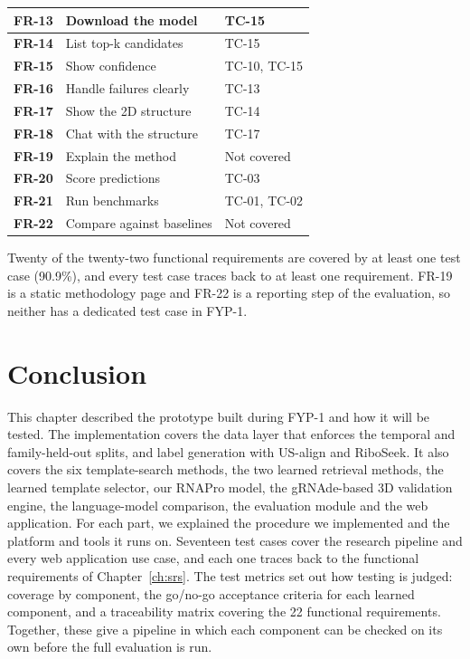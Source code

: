 \documentclass{FastFyp}
\begin{document}
{\begin{longtable}{|p{3.6cm}|p{5.6cm}|p{4.8cm}|}
\textbf{FR-13} & Download the model & TC-15 \\ \hline
\textbf{FR-14} & List top-k candidates & TC-15 \\ \hline
\textbf{FR-15} & Show confidence & TC-10, TC-15 \\ \hline
\textbf{FR-16} & Handle failures clearly & TC-13 \\ \hline
\textbf{FR-17} & Show the 2D structure & TC-14 \\ \hline
\textbf{FR-18} & Chat with the structure & TC-17 \\ \hline
\textbf{FR-19} & Explain the method & Not covered \\ \hline
\textbf{FR-20} & Score predictions & TC-03 \\ \hline
\textbf{FR-21} & Run benchmarks & TC-01, TC-02 \\ \hline
\textbf{FR-22} & Compare against baselines & Not covered \\ \hline
\end{longtable}
}

Twenty of the twenty-two functional requirements are covered by at least one test case (90.9\%), and every test case traces back to at least one requirement. FR-19 is a static methodology page and FR-22 is a reporting step of the evaluation, so neither has a dedicated test case in FYP-1.

\section{Conclusion}
This chapter described the prototype built during FYP-1 and how it will be tested. The implementation covers the data layer that enforces the temporal and family-held-out splits, and label generation with US-align and RiboSeek. It also covers the six template-search methods, the two learned retrieval methods, the learned template selector, our RNAPro model, the gRNAde-based 3D validation engine, the language-model comparison, the evaluation module and the web application. For each part, we explained the procedure we implemented and the platform and tools it runs on. Seventeen test cases cover the research pipeline and every web application use case, and each one traces back to the functional requirements of Chapter~\ref{ch:srs}. The test metrics set out how testing is judged: coverage by component, the go/no-go acceptance criteria for each learned component, and a traceability matrix covering the 22 functional requirements. Together, these give a pipeline in which each component can be checked on its own before the full evaluation is run.
 
\end{document}
